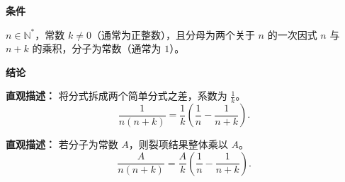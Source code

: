 \begin{statementbox}
	\textbf{\textcolor{CStatement}{条件}}
	\begin{description}[style=nextline, leftmargin=2.8em, labelsep=0.5em, itemsep=0.35em]
		\item[\textbf{\textcolor{CStatement}{条件 1（分母结构）：}}] $n\in\mathbb{N}^*$，常数 $k\neq0$（通常为正整数），且分母为两个关于 $n$ 的一次因式 $n$ 与 $n+k$ 的乘积，分子为常数（通常为 $1$）。
	\end{description}

	\textbf{\textcolor{CStatement}{结论}}
	\begin{description}[style=nextline, leftmargin=2.8em, labelsep=0.5em, itemsep=0.45em]
		\item[\textbf{\textcolor{CStatement}{结论一（裂项公式）：}}]
			\textbf{\textcolor{CStatement}{直观描述：}}
			将分式拆成两个简单分式之差，系数为 $\frac{1}{k}$。
			\[
				\frac{1}{n(n+k)} = \frac{1}{k}\left(\frac{1}{n} - \frac{1}{n+k}\right).
			\]

		\item[\textbf{\textcolor{CStatement}{推广结论（分子系数）：}}]
			\textbf{\textcolor{CStatement}{直观描述：}}
			若分子为常数 $A$，则裂项结果整体乘以 $A$。
			\[
				\frac{A}{n(n+k)} = \frac{A}{k}\left(\frac{1}{n} - \frac{1}{n+k}\right).
			\]
	\end{description}
\end{statementbox}
